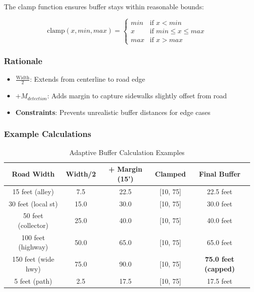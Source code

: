 \documentclass[11pt,letterpaper]{article}
\begin{document}
The clamp function ensures buffer stays within reasonable bounds:

\begin{equation}
\text{clamp}(x, min, max) =
\begin{cases}
min & \text{if } x < min \\
x & \text{if } min \leq x \leq max \\
max & \text{if } x > max
\end{cases}
\end{equation}

\subsubsection{Rationale}

\begin{itemize}
    \item \textbf{$\frac{\text{Width}}{2}$}: Extends from centerline to road edge
    \item \textbf{$+ M_{detection}$}: Adds margin to capture sidewalks slightly offset from road
    \item \textbf{Constraints}: Prevents unrealistic buffer distances for edge cases
\end{itemize}

\subsubsection{Example Calculations}

\begin{table}[H]
\centering
\begin{tabular}{ccccc}
\toprule
\textbf{Road Width} & \textbf{Width/2} & \textbf{+ Margin (15')} & \textbf{Clamped} & \textbf{Final Buffer} \\
\midrule
15 feet (alley) & 7.5 & 22.5 & [10, 75] & 22.5 feet \\
30 feet (local st) & 15.0 & 30.0 & [10, 75] & 30.0 feet \\
50 feet (collector) & 25.0 & 40.0 & [10, 75] & 40.0 feet \\
100 feet (highway) & 50.0 & 65.0 & [10, 75] & 65.0 feet \\
150 feet (wide hwy) & 75.0 & 90.0 & [10, 75] & \textbf{75.0 feet (capped)} \\
5 feet (path) & 2.5 & 17.5 & [10, 75] & 17.5 feet \\
\bottomrule
\end{tabular}
\caption{Adaptive Buffer Calculation Examples}
\label{tab:buffer_examples}
\end{table}
\end{document}
